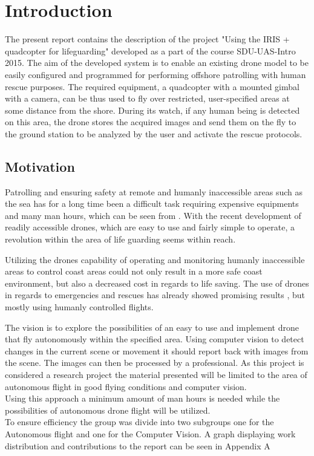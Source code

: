 \chapter*{Introduction}

The present report contains the description of the  project "Using the IRIS + quadcopter for lifeguarding" developed as a part of the course  SDU-UAS-Intro 2015. 
The aim of the developed system is to enable an existing drone model to be easily configured and programmed for performing offshore patrolling with human rescue purposes. 
The required equipment, a quadcopter with a mounted gimbal with a camera, can be thus used to fly over restricted, user-specified areas at some distance from the shore. 
During its watch, if any human being is detected on this area, the drone stores the acquired images and send them on the fly to the ground station to be analyzed by the user and activate the rescue protocols. 



\section*{Motivation}
Patrolling and ensuring safety at remote and humanly inaccessible areas such as the sea has for a long time been a difficult task requiring expensive equipments and many man hours, which can be seen from \cite{Ref:Drone2}. With the recent development of readily accessible drones, which are easy to use and fairly simple to operate, a revolution within the area of life guarding seems within reach. 

Utilizing the drones capability of operating and monitoring humanly inaccessible areas to control coast areas could not only result in a more safe coast environment, but also a decreased cost in regards to life saving. The use of drones in regards to emergencies and rescues has already showed promising results \cite{Ref:Drone1} \cite{Ref:Drone3} \cite{Ref:Drone4} \cite{Ref:DroneResearch1} \cite{Ref:DroneResearch1}, but mostly using humanly controlled flights.

The vision is to explore the possibilities of an easy to use and implement drone that fly autonomously within the specified area. Using computer vision to detect changes in the current scene or movement it should report back with images from the scene. The images can then be processed by a professional. As this project is considered a research project the material presented will be limited to the area of autonomous flight in good flying conditions and computer vision.\\ 
Using this approach a minimum amount of man hours is needed while the possibilities of autonomous drone flight will be utilized.\\
To ensure efficiency the group was divide into two subgroups one for the Autonomous flight and one for the Computer Vision. A graph displaying work distribution and contributions to the report can be seen in Appendix A


